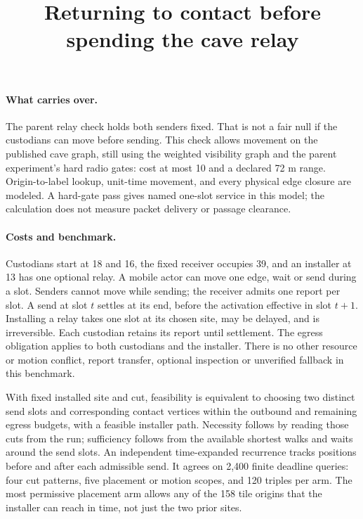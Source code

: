 \documentclass[11pt]{article}
\title{Returning to contact before spending the cave relay}
\author{}\date{}
\begin{document}
\maketitle

\paragraph{What carries over.}
The parent relay check holds both senders fixed. That is not a fair
null if the custodians can move before sending. This check allows
movement on the published cave graph, still using the weighted
visibility graph and the parent experiment's hard radio gates:
cost at most 10 and a declared 72 m range. Origin-to-label lookup,
unit-time movement, and every physical edge closure are modeled.
A hard-gate pass gives named one-slot service in this model; the
calculation does not measure packet delivery or passage clearance.

\paragraph{Costs and benchmark.}
Custodians start at 18 and 16, the fixed receiver occupies 39, and
an installer at 13 has one optional relay. A mobile actor can move
one edge, wait or send during a slot. Senders cannot move while
sending; the receiver admits one report per slot. A send at
slot $t$ settles at its end, before the activation effective in
slot $t+1$. Installing a relay takes one slot at its chosen site,
may be delayed, and is irreversible. Each custodian retains
its report until settlement. The egress obligation applies to
both custodians and the installer. There is no other resource
or motion conflict, report transfer, optional inspection or
unverified fallback in this benchmark.

With fixed installed site and cut, feasibility is equivalent
to choosing two distinct send slots and corresponding contact
vertices within the outbound and remaining egress budgets, with
a feasible installer path. Necessity follows by reading those
cuts from the run; sufficiency follows from the available shortest
walks and waits around the send slots. An independent time-expanded
recurrence tracks positions before and after each admissible send.
It agrees on 2,400 finite deadline queries: four cut patterns, five
placement or motion scopes, and 120 triples per arm. The most
permissive placement arm allows any of the 158 tile origins that
the installer can reach in time, not just the two prior sites.
\end{document}
